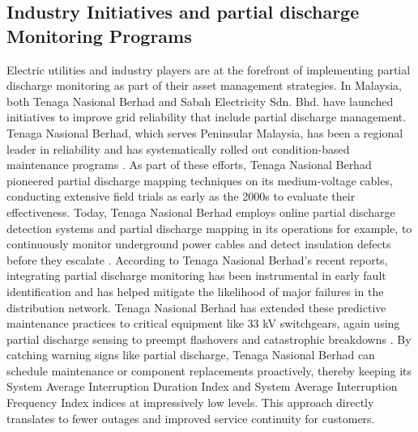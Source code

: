 \subsection{Industry Initiatives and partial discharge Monitoring Programs}

Electric utilities and industry players are at the forefront of implementing partial discharge monitoring as part of their asset management strategies. In Malaysia, both Tenaga Nasional Berhad and Sabah Electricity Sdn. Bhd. have launched initiatives to improve grid reliability that include partial discharge management. Tenaga Nasional Berhad, which serves Peninsular Malaysia, has been a regional leader in reliability and has systematically rolled out condition-based maintenance programs \parencite{Abdullah_2019}. As part of these efforts, Tenaga Nasional Berhad pioneered partial discharge mapping techniques on its medium-voltage cables, conducting extensive field trials as early as the 2000s to evaluate their effectiveness. Today, Tenaga Nasional Berhad employs online partial discharge detection systems and partial discharge mapping in its operations for example, to continuously monitor underground power cables and detect insulation defects before they escalate \parencite{Abdullah_2019}. According to Tenaga Nasional Berhad's recent reports, integrating partial discharge monitoring has been instrumental in early fault identification and has helped mitigate the likelihood of major failures in the distribution network. Tenaga Nasional Berhad has extended these predictive maintenance practices to critical equipment like 33 kV switchgears, again using partial discharge sensing to preempt flashovers and catastrophic breakdowns \parencite{Alsumaidaee_2022}. By catching warning signs like partial discharge, Tenaga Nasional Berhad can schedule maintenance or component replacements proactively, thereby keeping its System Average Interruption Duration Index and System Average Interruption Frequency Index indices at impressively low levels. This approach directly translates to fewer outages and improved service continuity for customers.

